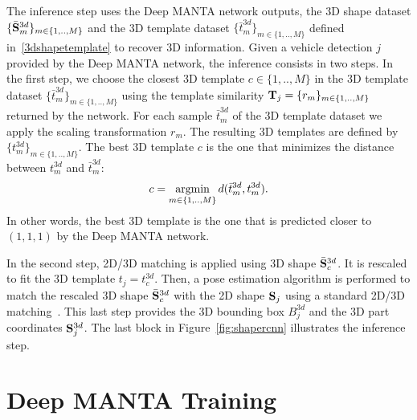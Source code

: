 \documentclass[10pt,twocolumn,letterpaper]{article}
\begin{document}
The inference step uses the Deep MANTA network outputs, the 3D shape dataset $\{\bar{\bold{S}}_m^{3d}\}_{m \in \{1,.., M\}}$ and the 3D template dataset $\{\bar{t}_m^{3d}\}_{m \in \{1,.., M\}}$ defined in~\ref{3dshapetemplate} to recover 3D information. Given a vehicle detection $j$ provided by the Deep MANTA network, the inference consists in two steps. In the first step, we choose the closest 3D template $c \in \{1,.., M\}$ in the 3D template dataset $\{\bar{t}_m^{3d}\}_{m \in \{1,.., M\}}$ using the template similarity $\bold{T}_j=\{r_m\}_{m \in \{1,.., M\}}$ returned by the network. For each sample $\bar{t}_m^{3d}$ of the 3D template dataset we apply the scaling transformation $r_m$. The resulting 3D templates are defined by $\{t_{m}^{3d}\}_{m \in \{1,.., M\}}$. The best 3D template $c$ is the one that minimizes the distance between $t_{m}^{3d}$ and $\bar{t}_m^{3d}$:
\[
c = \operatornamewithlimits{argmin}_{m \in \{1,.., M\}} d(\bar{t}_m^{3d},t_{m}^{3d}).
\]
In other words, the best 3D template is the one that is predicted closer to $(1,1,1)$ by the Deep MANTA network.

In the second step, 2D/3D matching is applied using 3D shape $\bar{\bold{S}}_{c}^{3d}$. It is rescaled to fit the 3D template $t_j=t_{c}^{3d}$. Then, a pose estimation algorithm is performed to match the rescaled 3D shape $\bar{\bold{S}}_c^{3d}$ with the 2D shape $\bold{S}_j$ using a standard 2D/3D matching~\cite{epnp}. This last step provides the 3D bounding box $B_j^{3d}$ and the 3D part coordinates $\bold{S}_j^{3d}$. The last block in Figure~\ref{fig:shapercnn} illustrates the inference step.

\section{Deep MANTA Training}
\end{document}
